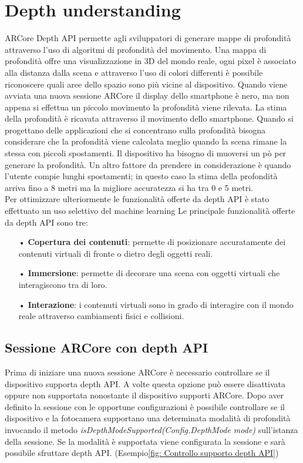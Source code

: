\documentclass[crop=false, class=book]{standalone}
\begin{document}
		
	\chapter{Depth understanding}
	
		ARCore Depth API  permette agli sviluppatori di generare mappe di profondità attraverso l'uso di algoritmi di 					profondità del movimento. Una mappa di profondità offre una visualizzazione in 3D del mondo reale, ogni pixel è 				associato alla distanza dalla scena e attraverso l'uso di colori differenti è possibile riconoscere quali aree dello 			spazio sono più vicine al dispositivo. Quando viene avviata una nuova sessione ARCore il display dello smartphone è 			nero, ma non appena si effettua un piccolo movimento la profondità viene rilevata. La stima della profondità è ricavata 		attraverso il movimento dello smartphone. Quando si progettano delle applicazioni che si concentrano sulla profondità 			bisogna considerare che la profondità viene calcolata meglio quando la scena rimane la stessa con piccoli spostamenti. 			Il dispositivo ha bisogno di muoversi un pò per generare la profondità. Un altro fattore da prendere in considerazione 			è quando l'utente compie lunghi spostamenti; in questo caso la stima della profondità arriva fino a 8 metri ma la 				migliore accuratezza si ha tra 0 e 5 metri.\\
		Per ottimizzare ulteriormente le funzionalità offerte da depth API è stato effettuato un uso selettivo del machine 				learning
		 Le principale funzionalità offerte da depth API sono tre:
		\begin{itemize}
			\item[•] \textbf{Copertura dei contenuti}: permette di posizionare accuratamente dei contenuti virtuali di fronte o dietro degli oggetti reali.
			\item[•] \textbf{Immersione}: permette di decorare una scena con oggetti virtuali che interagiscono tra di loro.
			\item[•] \textbf{Interazione}: i contenuti virtuali sono in grado di interagire con il mondo reale attraverso cambiamenti fisici e collisioni.
		\end{itemize}
		
		
		\section{Sessione ARCore con depth API}
		
			Prima di iniziare una nuova sessione ARCore è necessario controllare se il dispositivo supporta depth API. A volte 				questa opzione può essere disattivata oppure non supportata nonostante il dispositivo supporti ARCore. Dopo aver 				definito la sessione con le opportune configurazioni è possibile controllare se il dispositivo e la fotocamera 					supportano una determinata modalità di profondità invocando il metodo \textit{isDepthModeSupported(Config.DepthMode 			mode)} sull'istanza della sessione. Se la modalità è supportata viene configurata la sessione e sarà possibile 					sfruttare depth API. (Esempio\vref{fig: Controllo supporto depth API})\\
		
\end{document}
